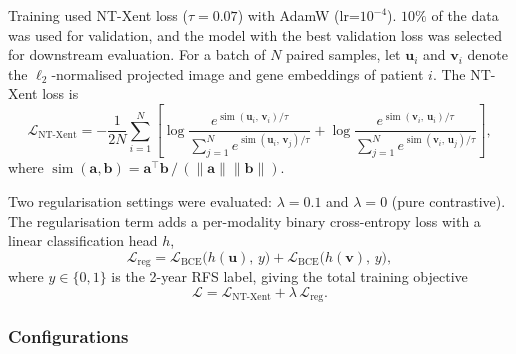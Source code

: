 \documentclass[12pt,twoside]{report}
\begin{document}
Training used NT-Xent loss ($\tau = 0.07$) with AdamW (lr=$10^{-4}$). $10\%$ of the data was used for validation, and the model with the best validation loss was selected for downstream evaluation.
For a batch of $N$ paired samples, let $\mathbf{u}_i$ and $\mathbf{v}_i$ denote the
$\ell_2$-normalised projected image and gene embeddings of patient $i$.
The NT-Xent loss is
\begin{equation}
\mathcal{L}_{\text{NT-Xent}} = -\frac{1}{2N} \sum_{i=1}^{N} \left[
  \log \frac{e^{\operatorname{sim}(\mathbf{u}_i,\,\mathbf{v}_i)/\tau}}
            {\sum_{j=1}^{N} e^{\operatorname{sim}(\mathbf{u}_i,\,\mathbf{v}_j)/\tau}}
+ \log \frac{e^{\operatorname{sim}(\mathbf{v}_i,\,\mathbf{u}_i)/\tau}}
            {\sum_{j=1}^{N} e^{\operatorname{sim}(\mathbf{v}_i,\,\mathbf{u}_j)/\tau}}
\right],
\label{eq:ntxent}
\end{equation}
where $\operatorname{sim}(\mathbf{a},\mathbf{b}) = \mathbf{a}^\top\mathbf{b}\,/\,(\|\mathbf{a}\|\|\mathbf{b}\|)$.

Two regularisation settings were evaluated: $\lambda = 0.1$ and $\lambda = 0$ (pure contrastive).
The regularisation term adds a per-modality binary cross-entropy loss with a linear classification head $h$,
\begin{equation}
\mathcal{L}_{\text{reg}} =
  \mathcal{L}_{\text{BCE}}\!\bigl(h(\mathbf{u}),\,y\bigr)
+ \mathcal{L}_{\text{BCE}}\!\bigl(h(\mathbf{v}),\,y\bigr),
\label{eq:reg}
\end{equation}
where $y \in \{0,1\}$ is the 2-year RFS label, giving the total training objective
\begin{equation}
\mathcal{L} = \mathcal{L}_{\text{NT-Xent}} + \lambda\,\mathcal{L}_{\text{reg}}.
\label{eq:total}
\end{equation}

\subsubsection*{Configurations}
\end{document}
